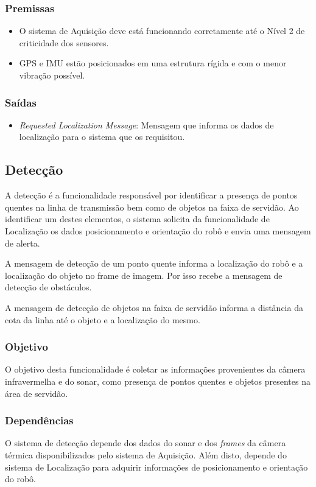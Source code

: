 \subsubsection{Premissas}
\begin{itemize}
	\item O sistema de Aquisição deve está funcionando corretamente até o Nível 2 de criticidade dos sensores.
	\item GPS e IMU estão posicionados em uma estrutura rígida e com o menor vibração possível.
\end{itemize}

\subsubsection{Saídas}

\begin{itemize}
	\item \textit{Requested Localization Message}: Mensagem que informa os dados de localização para o sistema que os requisitou.
\end{itemize}

\subsection{Detecção}
\label{ssec:func3}

A detecção é a funcionalidade responsável por identificar a presença de pontos quentes na linha de transmissão bem como de objetos na faixa de servidão. Ao identificar um destes elementos, o sistema solicita da funcionalidade de Localização os dados posicionamento e orientação do robô e envia uma mensagem de alerta.

A mensagem de detecção de um ponto quente informa a localização do robô e a localização do objeto no frame de imagem. Por isso recebe a mensagem de detecção de obstáculos. 

A mensagem de detecção de objetos na faixa de servidão informa a distância da cota da linha até o objeto e a localização do mesmo. 

\subsubsection{Objetivo}

O objetivo desta funcionalidade é coletar as informações provenientes da câmera infravermelha e do sonar, como presença de pontos quentes e objetos presentes na área de servidão. 

\subsubsection{Dependências}
O sistema de detecção depende dos dados do sonar e dos \textit{frames} da câmera térmica disponibilizados pelo sistema de Aquisição. Além disto, depende do sistema de Localização para adquirir informações de posicionamento e orientação do robô.

